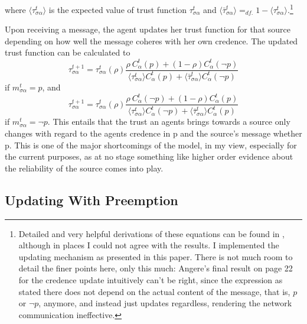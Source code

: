 \documentclass[11pt, a4paper]{scrartcl}
\newcommand{\sa}{{\sigma\alpha}}
\renewcommand{\a}{\alpha}
\begin{document}
where $\langle \tau^t_{\sa} \rangle $ is the expected value of trust function $ \tau^t_{\sa} $ and ${\langle \bar{\tau}^t_{\sa} \rangle =_{df.} 1 - \langle \tau^t_{\sa} \rangle}$.\footnote{Detailed and very helpful derivations of these equations can be found in \textcite{Angere2010}, although in places I could not agree with the results. I implemented the updating mechanism as presented in this paper. There is not much room to detail the finer points here, only this much: Angere's final result on page 22 for the credence update intuitively can't be right, since the expression as stated there does not depend on the actual content of the message, that is, $p$ or $\neg p$, anymore, and instead just updates regardless, rendering the network communication ineffective.} 

Upon receiving a message, the agent updates her trust function for that source depending on how well the message coheres with her own credence. The updated trust function can be calculated to
\[
    \tau^{t+1}_\sa = \tau^t_\sa (\rho) \frac{\rho \: C^t_\a (p) + (1 - \rho) C^t_\a (\neg p)}
    {\langle \tau^t_\sa \rangle C^t_\a(p) + \langle \bar{\tau}^t_\sa \rangle C^t_\a(\neg p)}
\]
if $m^t_{\sa} = p$, and 
\[
    \tau^{t+1}_\sa = \tau^t_\sa (\rho) \frac{\rho \: C^t_\a (\neg p) + (1 - \rho) C^t_\a (p)}
    {\langle \tau^t_\sa \rangle C^t_\a(\neg p) + \langle \bar{\tau}^t_\sa \rangle C^t_\a(p)}
\]
if $m^t_{\sa} = \neg p$. This entails that the trust an agents brings towards a source only changes with regard to the agents credence in p and the source's message whether p. This is one of the major shortcomings of the model, in my view, especially for the current purposes, as at no stage something like higher order evidence about the reliability of the source comes into play. 

\subsection{Updating With Preemption}
\end{document}
